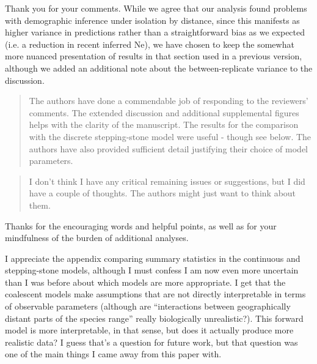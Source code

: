 Thank you for your comments. While we agree that our analysis found problems with demographic inference under isolation by distance, since this manifests as higher variance in predictions rather than a straightforward bias as we expected (i.e. a reduction in recent inferred Ne), we have chosen to keep the somewhat more nuanced presentation of results in that section used in a previous version,
although we added an additional note about the between-replicate variance to the discussion.



\begin{quote}
The authors have done a commendable job of responding to the reviewers' comments. The extended discussion and additional supplemental figures helps with the clarity of the manuscript. The results for the comparison with the discrete stepping-stone model were useful - though see below. The authors have also provided sufficient detail justifying their choice of model parameters.
\end{quote}

\begin{quote}
I don't think I have any critical remaining issues or suggestions, but I did have a couple of thoughts. The authors might just want to think about them.
\end{quote}

Thanks for the encouraging words and helpful points,
as well as for your mindfulness of the burden of additional analyses.

\begin{point}{}
I appreciate the appendix comparing summary statistics in the continuous and stepping-stone models, although I must confess I am now even more uncertain than I was before about which models are more appropriate. I get that the coalescent models make assumptions that are not directly interpretable in terms of observable parameters (although are ``interactions between geographically distant parts of the species range'' really biologically unrealistic?). This forward model is more interpretable, in that sense, but does it actually produce more realistic data? I guess that's a question for future work, but that question was one of the main things I came away from this paper with.
\end{point}


